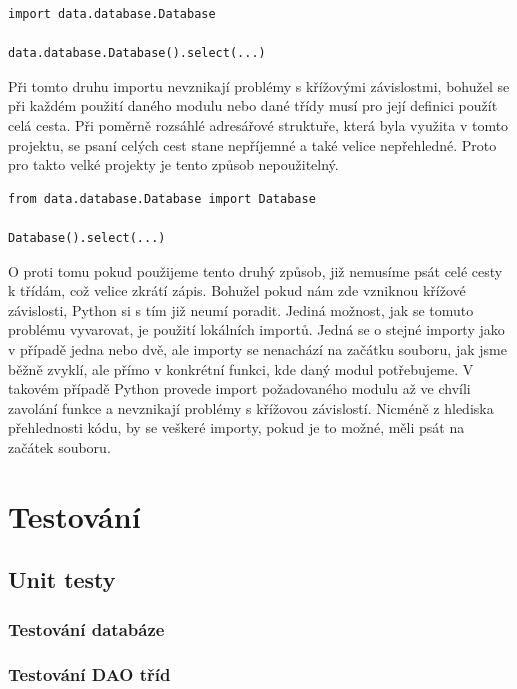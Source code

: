 \documentclass[thesis=B,czech]{resources/FITthesis}[2012/06/26]
\begin{document}
\begin{listing}[htbp]
\begin{verbatim}
import data.database.Database

data.database.Database().select(...)
\end{verbatim}
\end{listing}

Při tomto druhu importu nevznikají problémy s křížovými závislostmi, bohužel se při každém použití daného modulu nebo dané třídy musí pro její definici použít celá cesta. Při poměrně rozsáhlé adresářové struktuře, která byla využita v tomto projektu, se psaní celých cest stane nepříjemné a také velice nepřehledné. Proto pro takto velké projekty je tento způsob nepoužitelný.

\begin{listing}[htbp]
\begin{verbatim}
from data.database.Database import Database

Database().select(...)
\end{verbatim}
\end{listing}
O proti tomu pokud použijeme tento druhý způsob, již nemusíme psát celé cesty k třídám, což velice zkrátí zápis. Bohužel pokud nám zde vzniknou křížové závislosti, Python si s tím již neumí poradit. Jediná možnost, jak se tomuto problému vyvarovat, je použití lokálních importů. Jedná se o stejné importy jako v případě jedna nebo dvě, ale importy se nenachází na začátku souboru, jak jsme běžně zvyklí, ale přímo v konkrétní funkci, kde daný modul potřebujeme. V takovém případě Python provede import požadovaného modulu až ve chvíli zavolání funkce a nevznikají problémy s křížovou závislostí. Nicméně z hlediska přehlednosti kódu, by se veškeré importy, pokud je to možné, měli psát na začátek souboru. 

\chapter{Testování}
	\section{Unit testy}	
		\subsection{Testování databáze}
		\subsection{Testování DAO tříd}
\end{document}

